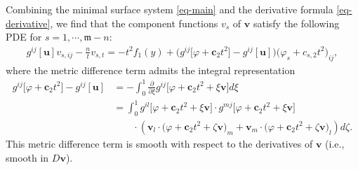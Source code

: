 \documentclass[11pt,reqno]{amsart}
\newcommand{\fm}{\mathfrak{m}}
\theoremstyle{definition}
\numberwithin{equation}{section}
\begin{document}
Combining the minimal surface system \eqref{eq-main} and the derivative formula \eqref{eq-derivative}, we find that the component functions $v_s$ of $\mathbf{v}$ satisfy the following PDE for $s=1,\cdots, \fm-n$:
\begin{align}\label{eq-v}
    g^{ij}[\mathbf{u}]v_{s,ij} - \frac{n}{t}  v_{s,t} = -t^2 f_1(y)+   \bigl(g^{ij}\bigl[\varphi +\mathbf{c}_2 t^2\bigr] -g^{ij}[\mathbf{u}]\bigr)\bigl(\varphi_{s} + c_{s,2}t^2\bigr)_{ij},
\end{align}
where the metric difference term admits the integral representation
\begin{align}
    g^{ij}\bigl[\varphi +\mathbf{c}_2 t^2\bigr] -g^{ij}[\mathbf{u}] &=- \int_0^1 \frac{\partial}{\partial \xi} g^{ij}\bigl[\varphi +\mathbf{c}_2 t^2+ \xi \mathbf{v}\bigr] d\xi\\
    &=\int_0^1  g^{il}\bigl[\varphi +\mathbf{c}_2 t^2+ \xi \mathbf{v}\bigr]\cdot g^{mj}\bigl[\varphi +\mathbf{c}_2 t^2+ \xi \mathbf{v}\bigr] \\
    &\qquad \cdot \left(\mathbf{v}_l \cdot \bigl(\varphi +\mathbf{c}_2 t^2+\zeta \mathbf{v}\bigr)_m +  \mathbf{v}_m \cdot \bigl(\varphi +\mathbf{c}_2 t^2+\zeta \mathbf{v}\bigr)_l    \right) d\zeta .
\end{align}
This metric difference term is smooth with respect to the derivatives of $\mathbf{v}$ (i.e., smooth in $D\mathbf{v}$).
\end{document}
